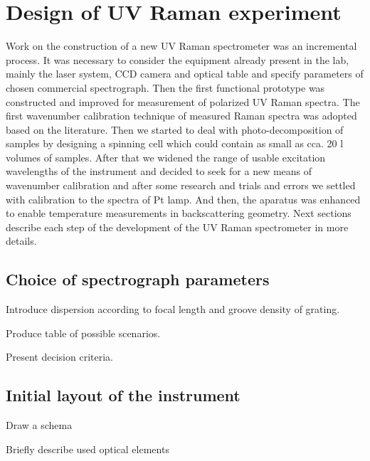 \section{Design of UV Raman experiment}

Work on the construction of a new UV Raman spectrometer was an incremental
process. It was necessary to consider the equipment already present in the lab,
mainly the laser system, CCD camera and optical table and specify parameters of
chosen commercial spectrograph. Then the first functional prototype was
constructed and improved for measurement of polarized UV Raman spectra. The
first wavenumber calibration technique of measured Raman spectra
was adopted based on the literature. Then we started to deal with
photo-decomposition of samples by designing a spinning cell which could contain
as small as cca. 20 l volumes of samples. After that we widened the range
of usable excitation wavelengths of the instrument and decided to seek for a
new means of wavenumber calibration and after some research and trials and
errors we settled with calibration to the spectra of Pt lamp. And then, the
aparatus was enhanced to enable temperature measurements in backscattering
geometry. Next sections describe each step of the development of the UV Raman
spectrometer in more details.





\subsection{Choice of spectrograph parameters}
\begin{docitemize}
	\item Introduce dispersion according to focal length and groove density of
	grating.
	\item Produce table of possible scenarios.
	\item Present decision criteria.
\end{docitemize}


\subsection{Initial layout of the instrument}
\begin{docitemize}
	\item Draw a schema
	\item Briefly describe used optical elements
\end{docitemize}


